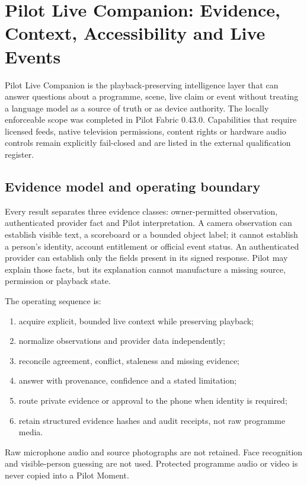 \section{Pilot Live Companion: Evidence, Context, Accessibility and Live Events}
\label{sec:pilot-live-companion-complete}

Pilot Live Companion is the playback-preserving intelligence layer that can answer
questions about a programme, scene, live claim or event without treating a language
model as a source of truth or as device authority.  The locally enforceable scope was
completed in Pilot Fabric 0.43.0.  Capabilities that require licensed feeds, native
television permissions, content rights or hardware audio controls remain explicitly
fail-closed and are listed in the external qualification register.

\subsection{Evidence model and operating boundary}

Every result separates three evidence classes: owner-permitted observation, authenticated
provider fact and Pilot interpretation.  A camera observation can establish visible text,
a scoreboard or a bounded object label; it cannot establish a person's identity, account
entitlement or official event status.  An authenticated provider can establish only the
fields present in its signed response.  Pilot may explain those facts, but its explanation
cannot manufacture a missing source, permission or playback state.

The operating sequence is:
\begin{enumerate}
  \item acquire explicit, bounded live context while preserving playback;
  \item normalize observations and provider data independently;
  \item reconcile agreement, conflict, staleness and missing evidence;
  \item answer with provenance, confidence and a stated limitation;
  \item route private evidence or approval to the phone when identity is required;
  \item retain structured evidence hashes and audit receipts, not raw programme media.
\end{enumerate}

Raw microphone audio and source photographs are not retained.  Face recognition and
visible-person guessing are not used.  Protected programme audio or video is never copied
into a Pilot Moment.

